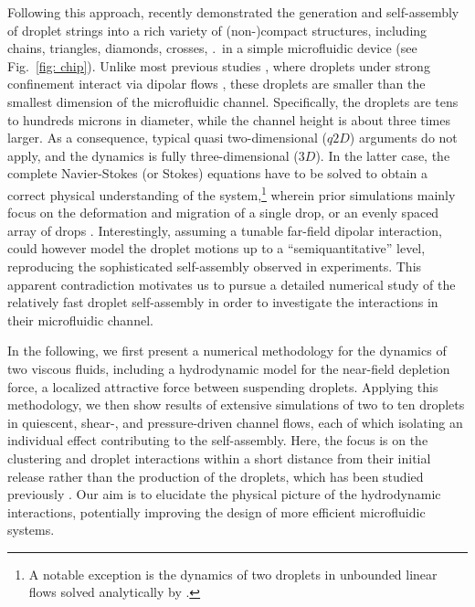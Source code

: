 Following this approach,   \cite{Shen_2016AS} recently demonstrated the generation and self-assembly of droplet strings into a rich variety of (non-)compact structures, including chains, triangles, diamonds, crosses, \etc .\ in a simple microfluidic device (see Fig.\ \ref{fig: chip}). Unlike most previous studies \citep{Cui2004,Beatus2006,Janssen2012,Uspal2013,Desreumaux,zhu_gallaire_2016}, where droplets under strong confinement interact via dipolar flows \citep{q2d_Beatus,Diamant}, these droplets are smaller than the smallest dimension of the microfluidic channel. Specifically, the droplets are tens to hundreds microns in diameter, while the channel height is about three times larger. As a consequence, typical quasi two-dimensional ($q2D$) arguments do not apply, and the dynamics is fully three-dimensional ($3D$). In the latter case, the complete Navier-Stokes (or Stokes) equations have to be solved to obtain a correct physical understanding of the system,\footnote{A notable exception is the dynamics of two droplets in unbounded linear flows solved analytically by \cite{batchelor_green_1972}.} wherein prior simulations mainly focus on the deformation and migration of a single drop, or an evenly spaced array of drops \citep{coulliette_pozrikidis_1998,Griggs2007,Janssen_Anderson_2007}. Interestingly, assuming a tunable far-field dipolar interaction,   \cite{Shen_2016AS} could however model the droplet motions up to a ``semiquantitative'' level, reproducing the sophisticated self-assembly observed in experiments. This apparent contradiction motivates us to pursue a detailed numerical study of the relatively fast droplet self-assembly in order to investigate the interactions in their microfluidic channel.

In the following, we first present a numerical methodology for the dynamics of two viscous fluids, including a hydrodynamic model for the near-field depletion force, a localized attractive force between suspending droplets. Applying this methodology, we then show results of extensive simulations of two to ten droplets in quiescent, shear-, and pressure-driven channel flows, each of which isolating an individual effect contributing to the self-assembly. Here, the focus is on the clustering and droplet interactions within a short distance from their initial release rather than the production of the droplets, which has been studied previously \cite{step-emuls}. Our aim is to elucidate the physical picture of the hydrodynamic interactions, potentially improving the design of more efficient microfluidic systems.


